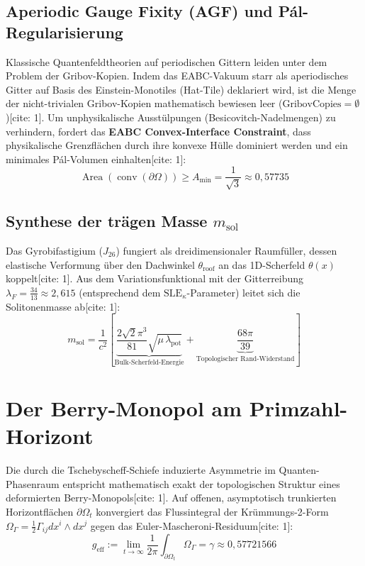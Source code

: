 \documentclass[11pt,a4paper]{article}
\begin{document}
	\subsection{Aperiodic Gauge Fixity (AGF) und Pál-Regularisierung}
	Klassische Quantenfeldtheorien auf periodischen Gittern leiden unter dem Problem der Gribov-Kopien. Indem das EABC-Vakuum starr als aperiodisches Gitter auf Basis des Einstein-Monotiles (Hat-Tile) deklariert wird, ist die Menge der nicht-trivialen Gribov-Kopien mathematisch bewiesen leer ($\text{GribovCopies}=\emptyset$)[cite: 1].
	Um unphysikalische Ausstülpungen (Besicovitch-Nadelmengen) zu verhindern, fordert das \textbf{EABC Convex-Interface Constraint}, dass physikalische Grenzflächen durch ihre konvexe Hülle dominiert werden und ein minimales Pál-Volumen einhalten[cite: 1]:
	\begin{equation}
		\operatorname{Area}(\operatorname{conv}(\partial \Omega)) \ge A_{\min}=\frac{1}{\sqrt{3}}\approx 0{,}57735
	\end{equation}
	
	\subsection{Synthese der trägen Masse $m_{\text{sol}}$}
	Das Gyrobifastigium ($J_{26}$) fungiert als dreidimensionaler Raumfüller, dessen elastische Verformung über den Dachwinkel $\theta_{\text{roof}}$ an das 1D-Scherfeld $\theta(x)$ koppelt[cite: 1]. Aus dem Variationsfunktional mit der Gitterreibung $\lambda_F = \frac{34}{13} \approx 2{,}615$ (entsprechend dem $\text{SLE}_\kappa$-Parameter) leitet sich die Solitonenmasse ab[cite: 1]:
	\begin{equation}
		m_{\text{sol}}=\frac{1}{c^2} \left[ \underbrace{\frac{2\sqrt{2}\pi^3}{81} \sqrt{\mu \, \lambda_{\text{pot}}}}_{\text{Bulk-Scherfeld-Energie}} + \underbrace{\frac{68\pi}{39}}_{\text{Topologischer Rand-Widerstand}} \right]
	\end{equation}
	
	\section{Der Berry-Monopol am Primzahl-Horizont}
	Die durch die Tschebyscheff-Schiefe induzierte Asymmetrie im Quanten-Phasenraum entspricht mathematisch exakt der topologischen Struktur eines deformierten Berry-Monopols[cite: 1]. Auf offenen, asymptotisch trunkierten Horizontflächen $\partial \Omega_t$ konvergiert das Flussintegral der Krümmungs-2-Form $\Omega_\Gamma = \frac{1}{2}\Gamma_{ij} dx^i \wedge dx^j$ gegen das Euler-Mascheroni-Residuum[cite: 1]:
	\begin{equation}
		g_{\text{eff}}:=\lim_{t\to\infty}\frac{1}{2\pi}\int_{\partial\Omega_t}\Omega_\Gamma=\gamma\approx 0{,}57721566
	\end{equation}
	
\end{document}
